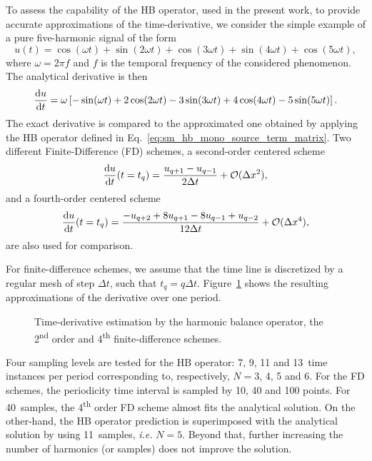 To assess the capability of the HB operator, used in the present work, to
provide accurate approximations of the time-derivative, 
we consider the simple example of a pure
five-harmonic signal of the form
\begin{equation}
    \label{eq:sum_sin}
    u(t) = \cos(\omega t) + \sin(2 \omega t) +
    \cos(3 \omega t) + \sin(4 \omega t) + \cos(5 \omega t),
\end{equation}
where $\omega = 2 \pi f$ and $f$ is the temporal frequency of
the considered phenomenon.
The analytical derivative is then
\begin{equation}
    \label{eq:sum_sin_deriv}
    \frac{\diff u}{\diff t} = 
    \omega\left[ -\sin(\omega t) + 
    2\cos(2 \omega t) -
    3\sin(3 \omega t) + 
    4\cos(4 \omega t) -
    5\sin(5 \omega t)\right].
\end{equation}
The exact derivative is compared to the approximated one obtained by applying 
the HB operator defined in Eq.~\eqref{eq:sm_hb_mono_source_term_matrix}.
Two different Finite-Difference (FD) schemes,
a second-order centered scheme
\begin{equation}
    \frac{\diff u}{\diff t} (t=t_q) =
    \frac{u_{q+1} - u_{q-1}}{2 \Delta t} + \mathcal{O} (\Delta x^2),
    \label{eq:hb_op_center2}
\end{equation}
and a fourth-order centered scheme
\begin{equation}
    \frac{\diff u}{\diff t} (t=t_q) =
    \frac{-u_{q+2} + 8 u_{q+1} - 8 u_{q-1} + u_{q-2}}{12\Delta t}
    + \mathcal{O} (\Delta x^4),
    \label{eq:hb_op_center4}
\end{equation}
are also used for comparison.

For finite-difference schemes, 
we assume that the time line is discretized 
by a regular mesh of step $\Delta t$, such that $t_q = q \Delta t$.
Figure~\ref{fig:hb_operator_sample} shows the resulting approximations 
of the derivative over one period.
\begin{figure}[htp]
  \centering
  \caption{Time-derivative estimation by the harmonic balance operator,
  the 2\textsuperscript{nd} order and 4\textsuperscript{th} finite-difference schemes.}
  \label{fig:hb_operator_sample}
\end{figure}
Four sampling levels
are tested for the HB operator: 7, 9, 11 and 13~time instances per period
corresponding to, respectively, $N=3$, 4, 5 and 6.
For the FD schemes, the periodicity time interval is sampled by
10, 40 and 100 points.
For 40~samples, the 4\textsuperscript{th} order FD
scheme almost fits the analytical solution. On the other-hand,
the HB operator prediction is superimposed with the analytical solution
by using 11~samples, \emph{i.e.} $N=5$. Beyond that, further increasing the
number of harmonics (or samples)
does not improve the solution.

